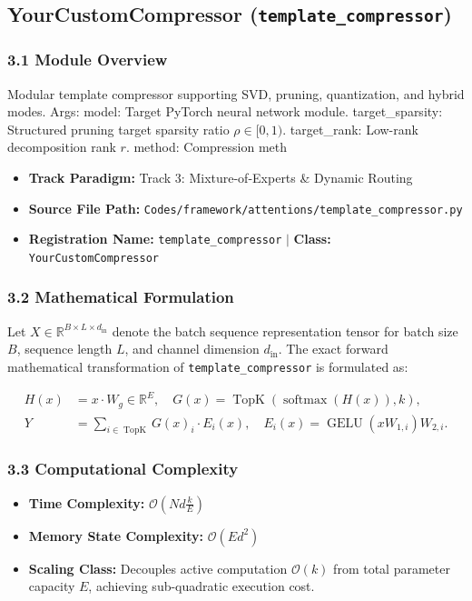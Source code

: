 \subsection{YourCustomCompressor (\texttt{template\_compressor})}
\label{sec:app_module_template\_compressor}

\subsubsection*{3.1 Module Overview}
Modular template compressor supporting SVD, pruning, quantization, and hybrid modes.  Args:     model: Target PyTorch neural network module.     target\_sparsity: Structured pruning target sparsity ratio $\rho \in [0, 1)$.     target\_rank: Low-rank decomposition rank $r$.     method: Compression meth
\begin{itemize}
    \item \textbf{Track Paradigm:} Track 3: Mixture-of-Experts & Dynamic Routing
    \item \textbf{Source File Path:} \texttt{Codes/framework/attentions/template\_compressor.py}
    \item \textbf{Registration Name:} \texttt{template\_compressor} $\mid$ \textbf{Class:} \texttt{YourCustomCompressor}
\end{itemize}

\subsubsection*{3.2 Mathematical Formulation}
Let $X \in \mathbb{R}^{B \times L \times d_{\text{in}}}$ denote the batch sequence representation tensor for batch size $B$, sequence length $L$, and channel dimension $d_{\text{in}}$. The exact forward mathematical transformation of \texttt{template\_compressor} is formulated as:

\begin{align}
H(x) &= x \cdot W_g \in \mathbb{R}^{E}, \quad G(x) = \operatorname{TopK}\left(\operatorname{softmax}(H(x)), k\right), \\
Y &= \sum_{i \in \operatorname{TopK}} G(x)_i \cdot E_i(x), \quad E_i(x) = \operatorname{GELU}(x W_{1, i}) W_{2, i}.
\end{align}


\subsubsection*{3.3 Computational Complexity}
\begin{itemize}
    \item \textbf{Time Complexity:} $\mathcal{O}(N d \frac{k}{E})$
    \item \textbf{Memory State Complexity:} $\mathcal{O}(E d^2)$
    \item \textbf{Scaling Class:} Decouples active computation $\mathcal{O}(k)$ from total parameter capacity $E$, achieving sub-quadratic execution cost.
\end{itemize}

